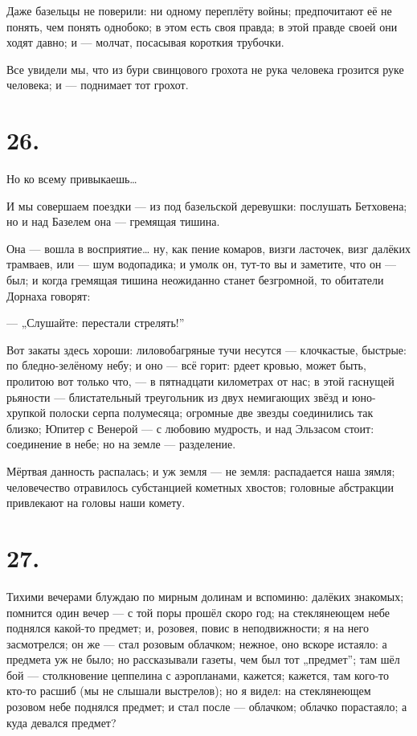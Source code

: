 \documentclass[12pt,a4paper,oneside]{book}
\begin{document}
Даже базельцы не поверили: ни одному переплёту войны; предпочитают её не понять, чем понять однобоко; в этом есть своя правда; в этой правде своей они ходят давно; и — молчат, посасывая короткия трубочки.

Все увидели мы, что из бури свинцового грохота не рука человека грозится руке человека; и — поднимает тот грохот.

\section*{26.}

Но ко всему привыкаешь…

И мы совершаем поездки — из под базельской деревушки: послушать Бетховена; но и над Базелем она — гремящая тишина.

Она — вошла в восприятие… ну, как пение комаров, визги ласточек, визг далёких трамваев, или — шум водопадика; и умолк он, тут-то вы и заметите, что он — был; и когда гремящая тишина неожиданно станет безгромной, то обитатели Дорнаха говорят:

— „Слушайте: перестали стрелять!”

Вот закаты здесь хороши: лиловобагряные тучи несутся — клочкастые, быстрые: по бледно-зелёному небу; и оно — всё горит: рдеет кровью, может быть, пролитою вот только что, — в пятнадцати километрах от нас; в этой гаснущей рьяности — блистательный треугольник из двух немигающих звёзд и юно-хрупкой полоски серпа полумесяца; огромные две звезды соединились так близко; Юпитер с Венерой — с любовию мудрость, и над Эльзасом стоит: соединение в небе; но на земле — разделение.

Мёртвая данность распалась; и уж земля — не земля: распадается наша зямля; человечество отравилось субстанцией кометных хвостов; головные абстракции привлекают на головы наши комету.

\section*{27.}

Тихими вечерами блуждаю по мирным долинам и вспоминю: далёких знакомых; помнится один вечер — с той поры прошёл скоро год; на стеклянеющем небе поднялся какой-то предмет; и, розовея, повис в неподвижности; я на него засмотрелся; он же — стал розовым облачком; нежное, оно вскоре истаяло: а предмета уж не было; но рассказывали газеты, чем был тот „предмет”; там шёл бой — столкновение цеппелина с аэропланами, кажется; кажется, там кого-то кто-то расшиб (мы не слышали выстрелов); но я видел: на стеклянеющем розовом небе поднялся предмет; и стал после — облачком; облачко порастаяло; а куда девался предмет?
\end{document}
